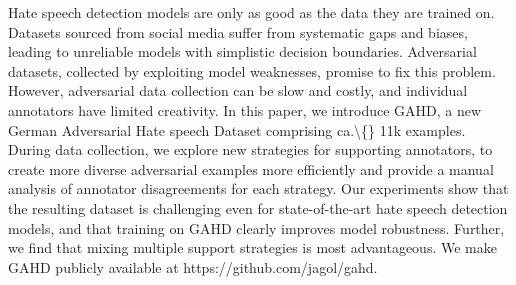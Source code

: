 Hate speech detection models are only as good as the data they are trained on. Datasets sourced from social media suffer from systematic gaps and biases, leading to unreliable models with simplistic decision boundaries. Adversarial datasets, collected by exploiting model weaknesses, promise to fix this problem. However, adversarial data collection can be slow and costly, and individual annotators have limited creativity. In this paper, we introduce GAHD, a new German Adversarial Hate speech Dataset comprising ca.\textbackslash\{\} 11k examples. During data collection, we explore new strategies for supporting annotators, to create more diverse adversarial examples more efficiently and provide a manual analysis of annotator disagreements for each strategy. Our experiments show that the resulting dataset is challenging even for state-of-the-art hate speech detection models, and that training on GAHD clearly improves model robustness. Further, we find that mixing multiple support strategies is most advantageous. We make GAHD publicly available at https://github.com/jagol/gahd.